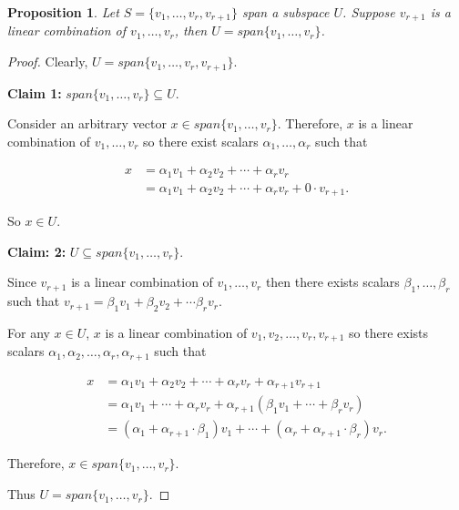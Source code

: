 \documentclass[12pt]{article}
\newtheorem*{proposition}{Proposition}
\theoremstyle{definition}
\begin{document}
\begin{proposition}
Let $S = \{ v_1, \ldots, v_r, v_{r+1}\}$ span a subspace $U$. Suppose $v_{r+1}$ is a linear
combination of $v_1, \ldots, v_r$, then $U = span\{v_1, \ldots, v_r \}$.
\end{proposition}

\begin{proof}
Clearly, $U = span\{v_1, \ldots, v_r, v_{r+1} \}$.

\vspace{0.5cm}

\textbf{Claim 1:} $span\{v_1, \ldots, v_r\} \subseteq U$.

\vspace{0.5cm}

Consider an arbitrary vector $x \in span\{v_1, \ldots, v_r\}$. Therefore, $x$ is a linear
combination of $v_1, \ldots, v_r$ so there exist scalars $\alpha_1, \dots, \alpha_r$
such that

\begin{align*}
x &= \alpha_1 v_1 + \alpha_2 v_2 + \cdots + \alpha_r v_r \\
&= \alpha_1 v_1 + \alpha_2 v_2 + \cdots + \alpha_r v_r + 0 \cdot v_{r+1}.
\end{align*}

So $x \in U$.

\vspace{0.2cm}

\textbf{Claim: 2:} $U \subseteq span\{v_1, \ldots, v_r\}$.

\vspace{0.2cm}

Since $v_{r+1}$ is a linear combination of $v_1, \ldots, v_r$ then there exists scalars
$\beta_1, \ldots, \beta_r$ such that 
$v_{r+1} = \beta_1 v_1 + \beta_2 v_2 + \cdots \beta_r v_r$.

For any $x \in U$, $x$ is a linear combination of $v_1, v_2, \ldots, v_r, v_{r+1}$ so
there exists scalars $\alpha_1, \alpha_2, \ldots, \alpha_r, \alpha_{r+1}$ such that

\begin{align*}
x &= \alpha_1 v_1 + \alpha_2 v_2 + \cdots + \alpha_r v_r + \alpha_{r+1} v_{r+1} \\
&= \alpha_1 v_1 + \cdots + \alpha_r v_r + \alpha_{r+1} (\beta_1 v_1 + \cdots + \beta_r v_r) \\
&= (\alpha_1 + \alpha_{r+1} \cdot \beta_1) v_1 + \cdots + (\alpha_r + \alpha_{r+1} \cdot \beta_r) v_r.
\end{align*}

Therefore, $x \in span\{v_1, \ldots, v_r\}$.

Thus $U = span\{v_1, \ldots, v_r\}$.
\end{proof}
\end{document}
